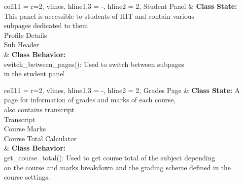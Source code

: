 \documentclass[11pt]{article}
\begin{document}
\begin{longtblr}[
  label = none,
  entry = none,
]{
  cell{1}{1} = {r=2}{},
  vlines,
  hline{1,3} = {-}{},
  hline{2} = {2}{},
}
Student Panel & {\textbf{Class State:} This panel is accessible to students of IIIT and contain various \\
subpages dedicated to them\\
\hspace{\dimexpr\labelsep+0.5\tabcolsep}Profile Details\\
\hspace{\dimexpr\labelsep+0.5\tabcolsep}Sub Header} \\
              & {\textbf{Class Behavior:}\\
\hspace{\dimexpr\labelsep+0.5\tabcolsep}switch\_between\_pages(): Used to switch between subpages
\\in the student panel}
\end{longtblr}


\begin{longtblr}[
  label = none,
  entry = none,
]{
  cell{1}{1} = {r=2}{},
  vlines,
  hline{1,3} = {-}{},
  hline{2} = {2}{},
}
Grades Page & {\textbf{Class State:} A page for information of grades and marks of each course, \\also contains transcript\\
\hspace{\dimexpr\labelsep+0.5\tabcolsep}Transcript\\
\hspace{\dimexpr\labelsep+0.5\tabcolsep}Course Marks\\
\hspace{\dimexpr\labelsep+0.5\tabcolsep}Course Total Calculator} \\
            & {\textbf{Class Behavior:}\\
\hspace{\dimexpr\labelsep+0.5\tabcolsep}get\_course\_total(): Used to get course total of the subject
depending \\on the course and marks breakdown and the grading scheme defined in the \\course settings. }
\end{longtblr}
\end{document}
